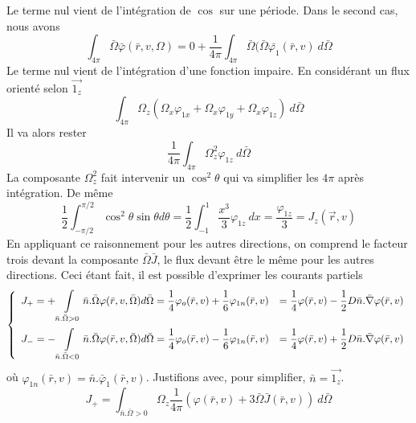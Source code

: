 Le terme nul vient de l'intégration de $\cos$ sur une période. Dans le second cas, nous avons
\begin{equation}
\int_{4\pi} \bar\Omega \bar\varphi(\bar r, v, \Omega) = 0 + \frac{1}{4\pi}\int_{4\pi} 
\bar \Omega (\bar\Omega\bar{\varphi_1}(\bar{r},v)\ d\bar \Omega
\end{equation}
Le terme nul vient de l'intégration d'une fonction impaire. En considérant un flux orienté selon
$\vec{1_z}$
\begin{equation}
\int_{4\pi} \Omega_z(\Omega_x\varphi_{1x}+\Omega_x\varphi_{1y}+\Omega_x\varphi_{1z})\ d\bar{\Omega}
\end{equation}
Il va alors rester
\begin{equation}
\frac{1}{4\pi} \int_{4\pi} \Omega_z^2\varphi_{1z}\ d\bar{\Omega}
\end{equation}
La composante $\Omega_z^2$ fait intervenir un $\cos^2\theta$ qui va simplifier les $4\pi$ après 
intégration. De même
\begin{equation}
\frac{1}{2}\int_{-\pi/2}^{\pi/2} \cos^2\theta\sin\theta d\theta = \frac{1}{2}\int_{-1}^1\frac{x^3}{3}
\varphi_{1z}\ dx = \frac{\varphi_{1z}}{3} = J_z(\vec{r},v)
\end{equation}
En appliquant ce raisonnement pour les autres directions, on comprend le facteur trois devant 
la composante $\bar{\Omega}\bar{J}$, le flux devant être le même pour les autres directions. Ceci 
étant fait, il est possible d'exprimer les courants partiels 
\begin{equation}
\left\{\begin{array}{ll}
\DS {J_ + } =  + \int\limits_{\bar n.\bar \Omega  > 0}   \bar n.\bar \Omega \varphi (\bar r,v,\bar \Omega )d\bar \Omega  = \frac{1}{4}{\varphi _o}(\bar r,v) + \frac{1}{6}{\varphi _{1n}}(\bar r,v) &=\DS
 \frac{1}{4}\varphi (\bar r,v) - \frac{1}{2}D\bar n.\bar \nabla \varphi (\bar r,v)\vspace{2mm}\\
\DS{J_ - } =  - \int\limits_{\bar n.\bar \Omega  < 0}   \bar n.\bar \Omega \varphi (\bar r,v,\bar \Omega )d\bar \Omega  = \frac{1}{4}{\varphi _o}(\bar r,v) - \frac{1}{6}{\varphi _{1n}}(\bar r,v) 
&=\DS \frac{1}{4}\varphi (\bar r,v) + \frac{1}{2}D\bar n.\bar \nabla \varphi (\bar r,v)
\end{array}\right.
\end{equation}
où ${\varphi _{1n}}(\bar r,v) = \bar n.{\bar \varphi _1}(\bar r,v)$. Justifions avec, pour 
simplifier, $\bar n = \vec{1_z}$.
\begin{equation}
J_+ = \int_{\bar n.\bar{\Omega}>0} \Omega_z\frac{1}{4\pi}(\varphi(\bar r,v)+3\bar\Omega\bar{J}
(\bar r,v))\ d\bar{\Omega}
\end{equation}
